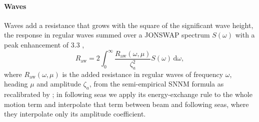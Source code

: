 \paragraph{Waves} Waves add a resistance that grows with the square of the significant wave height, the response in regular waves summed over a JONSWAP spectrum $S(\omega)$ with a peak enhancement of 3.3 \citep{hasselmann1973},
\begin{equation}
R_\mathrm{aw} = 2 \int_0^\infty \frac{R_\mathrm{aw}(\omega,\mu)}{\zeta_a^2} S(\omega)\,\mathrm d\omega,
\end{equation}
where $R_\mathrm{aw}(\omega,\mu)$ is the added resistance in regular waves of frequency $\omega$, heading $\mu$ and amplitude $\zeta_a$, from the semi-empirical SNNM formula as recalibrated by \citet{mittendorf2022}; in following seas we apply its energy-exchange rule to the whole motion term and interpolate that term between beam and following seas, where they interpolate only its amplitude coefficient.

